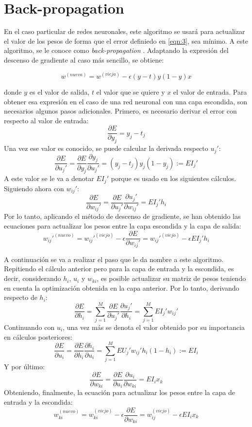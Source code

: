 \section{Back-propagation}

En el caso particular de redes neuronales, este algoritmo se usará para actualizar el valor de los pesos
de forma que el error definiedo en \ref{eqn:3}, sea mínimo. A este algoritmo, se le conoce como
\textit{back-propagation} \cite{rumelhart1986learning}. Adaptando la expresión del descenso de gradiente al caso más sencillo, se obtiene:

\begin{equation}
    \label{eqn:gradient_descent_nn}
    w^{(nueva)}=w^{(vieja)}-\epsilon (y-t)y(1-y)x
\end{equation}

donde $y$ es el valor de salida, $t$ el valor que se quiere y $x$ el valor de entrada. Para obtener esa
expresión en el caso de una red neuronal con una capa escondida, son necesarios algunos pasos adicionales.
Primero, es necesario derivar el error con respecto al valor de entrada:
\[
    \frac{\partial E}{\partial y_j} = y_j - t_j
\]
Una vez ese valor es conocido, se puede calcular la derivada respecto $u_j'$:
\[
    \frac{\partial E}{\partial u_j'} =     \frac{\partial E}{\partial y_j}     \frac{\partial y_j}{\partial u_j'}=
    (y_j-t_j)y_j(1-y_j) := EI_j'
\]
A este valor se le va a denotar $EI_j'$ porque es usado en los siguientes cálculos. Siguiendo ahora con $w_{ij}'$:
\[
    \frac{\partial E}{\partial w_{ij}'} =     \frac{\partial E}{\partial u_j'}     \frac{\partial u_j'}{\partial w_{ij}'} =
    EI_j' h_i
\]
Por lo tanto, aplicando el método de descenso de gradiente, se han obtenido las ecuaciones para actualizar los pesos
entre la capa escondida y la capa de salida:
\[
    w_{ij}'^{(nuevo)} = w_{ij}'^{(viejo)} - \epsilon \frac{\partial E}{\partial w_{ij}'} =
    w_{ij}'^{(viejo)}-\epsilon EI_j' h_i
\]

A continuación se va a realizar el paso que le da nombre a este algoritmo. Repitiendo el cálculo anterior
pero para la capa de entrada y la escondida, es decir, considerando $h_i$, $u_i$ y $w_{ki}$, es posible
actualizar su matriz de pesos teniendo en cuenta la optimización obtenida en la capa anterior. Por lo tanto,
derivando respecto de $h_i$:
\[
    \frac{\partial E}{\partial h_i} = \sum_{j=1}^M\frac{\partial E}{\partial u_j'} \frac{\partial u_j'}{\partial h_i} =
    \sum_{j=1}^M EI_j' w_{ij}'
\]
Continuando con $u_i$, una vez más se denota el valor obtenido por su importancia en cálculos posteriores:
\[
    \frac{\partial E}{\partial u_i} =     \frac{\partial E}{\partial h_i}     \frac{\partial h_i}{\partial u_i} =
    \sum_{j=1}^M  EU_j' w_{ij}' h_i (1-h_i) := EI_i
\]
Y por último:
\[
    \frac{\partial E}{\partial w_{ki}} = \frac{\partial E}{\partial u_i} \frac{\partial u_i}{\partial w_{ki}} =
    EI_i x_k
\]
Obteniendo, finalmente, la ecuación para actualizar los pesos entre la capa de entrada y la escondida:
\[
    w_{ki}^{(nuevo)} = w_{ki}^{(viejo)} - \epsilon \frac{\partial E}{\partial w_{ki}} =
    w_{ij}^{(viejo)}-\epsilon EI_i x_k
\]